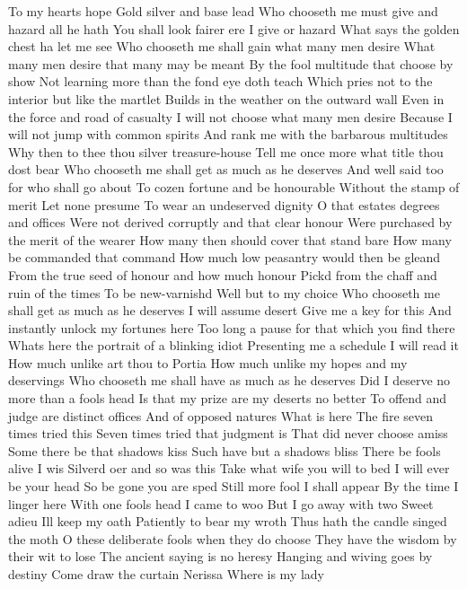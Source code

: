 To my hearts hope Gold silver and base lead 
Who chooseth me must give and hazard all he hath 
You shall look fairer ere I give or hazard 
What says the golden chest ha let me see 
Who chooseth me shall gain what many men desire 
What many men desire that many may be meant 
By the fool multitude that choose by show 
Not learning more than the fond eye doth teach 
Which pries not to the interior but like the martlet 
Builds in the weather on the outward wall 
Even in the force and road of casualty 
I will not choose what many men desire 
Because I will not jump with common spirits 
And rank me with the barbarous multitudes 
Why then to thee thou silver treasure-house 
Tell me once more what title thou dost bear 
Who chooseth me shall get as much as he deserves 
And well said too for who shall go about 
To cozen fortune and be honourable 
Without the stamp of merit Let none presume 
To wear an undeserved dignity 
O that estates degrees and offices 
Were not derived corruptly and that clear honour 
Were purchased by the merit of the wearer 
How many then should cover that stand bare 
How many be commanded that command 
How much low peasantry would then be gleand 
From the true seed of honour and how much honour 
Pickd from the chaff and ruin of the times 
To be new-varnishd Well but to my choice 
Who chooseth me shall get as much as he deserves 
I will assume desert Give me a key for this 
And instantly unlock my fortunes here 
Too long a pause for that which you find there 
Whats here the portrait of a blinking idiot 
Presenting me a schedule I will read it 
How much unlike art thou to Portia 
How much unlike my hopes and my deservings 
Who chooseth me shall have as much as he deserves 
Did I deserve no more than a fools head 
Is that my prize are my deserts no better 
To offend and judge are distinct offices 
And of opposed natures 
What is here 
The fire seven times tried this 
Seven times tried that judgment is 
That did never choose amiss 
Some there be that shadows kiss 
Such have but a shadows bliss 
There be fools alive I wis 
Silverd oer and so was this 
Take what wife you will to bed 
I will ever be your head 
So be gone you are sped 
Still more fool I shall appear 
By the time I linger here 
With one fools head I came to woo 
But I go away with two 
Sweet adieu Ill keep my oath 
Patiently to bear my wroth 
Thus hath the candle singed the moth 
O these deliberate fools when they do choose 
They have the wisdom by their wit to lose 
The ancient saying is no heresy 
Hanging and wiving goes by destiny 
Come draw the curtain Nerissa 
Where is my lady 
